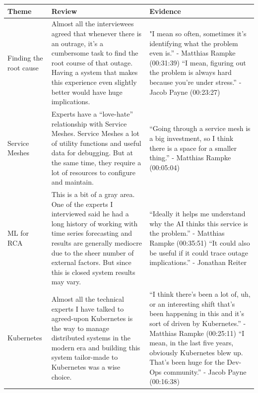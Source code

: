 \begin{longtable}{|p{30mm}|p{61mm}|p{60mm}|}
    \hline
    \textbf{Theme} &
    \textbf{Review} &
    \textbf{Evidence} \\ \hline
    
    Finding the root cause &
    Almost all the interviewees agreed that whenever there is an outrage, it’s a cumbersome task to find the root course of that outage. Having a system that makes this experience even slightly better would have huge implications. &
    "I mean so often, sometimes it's identifying what the problem even is.” - Matthias Rampke (00:31:39)
    \newline
    \newline
    “I mean, figuring out the problem is always hard because you're under stress.” - Jacob Payne (00:23:27)
    \\ \hline
    
    
    Service Meshes &
    Experts have a “love-hate” relationship with Service Meshes. Service Meshes a lot of utility functions and useful data for debugging. But at the same time, they require a lot of resources to configure and maintain. &
    “Going through a service mesh is a big investment, so I think there is a space for a smaller thing.” \newline- Matthias Rampke (00:05:04) \\ \hline
    
    
    ML for RCA &
    This is a bit of a gray area. One of the experts I interviewed said he had a long history of working with time series forecasting and results are generally mediocre due to the sheer number of external factors. But since this is closed system results may vary. &
    “Ideally it helps me understand why the AI thinks this service is the problem.” \newline- Matthias Rampke (00:35:51)
    \newline
    \newline
    “It could also be useful if it could trace outage implications.” \newline- Jonathan Reiter \\ \hline
    
    
    Kubernetes &
    Almost all the technical experts I have talked to agreed-upon Kubernetes is the way to manage distributed systems in the modern era and building this system tailor-made to Kubernetes was a wise choice. &
    “I think there's been a lot of, uh, or an interesting shift that's been happening in this and it's sort of driven by Kubernetes.” \newline- Matthias Rampke (00:25:11)
    \newline
    \newline
    “I mean, in the last five years, obviously Kubernetes blew up. That's been huge for the Dev-Ops community.” \newline- Jacob Payne (00:16:38) \\ \hline
    

\end{longtable}
